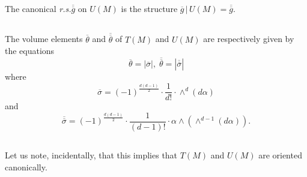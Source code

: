 \subsection{}\label{chap5:5.2.4}

\begin{defi*}
The canonical {\em r.s.}\@ $\overline{\overline{g}}$ on $U(M)$ is the
structure $\overline{g}\,|\, U(M)=\overline{\overline{g}}$.
\end{defi*}

\subsection{}\label{chap5:5.2.5}

\begin{prop*}
The volume elements $\overline{\theta}$ and
$\overline{\overline{\theta}}$ of $T(M)$ and $U(M)$ are respectively
given by the equations
$$
\overline{\theta}=|\overline{\sigma}|, \;
\overline{\overline{\theta}}=|\overline{\overline{\sigma}}|  
$$
where
$$
\overline{\sigma}=(-1)^{\frac{d(d-1)}{2}}\cdot \frac{1}{d!}\cdot
\mathop{\wedge}^{d}(d\alpha) 
$$
and 
$$
\overline{\overline{\sigma}}=(-1)^{\frac{d(d-1)}{2}}\cdot
\frac{1}{(d-1)!}\cdot\alpha\wedge(\mathop{\wedge}^{d-1}(d\alpha)). 
$$
\end{prop*}

\setcounter{subsection}{5}
\subsection{}\label{chap5:5.2.6}
Let us note, incidentally, that this implies that $T(M)$ and $U(M)$
are oriented canonically.



